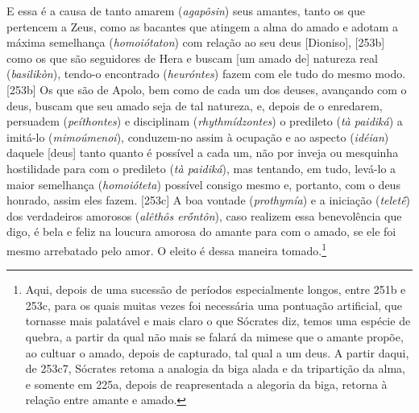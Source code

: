 E essa é a causa de tanto amarem (\emph{agapôsin}) seus amantes, tanto
os que pertencem a Zeus, como as bacantes que atingem a alma do amado e
adotam a máxima semelhança (\emph{homoiótaton}) com relação ao seu deus
{[}Dioniso{]}, {[}253b{]} como os que são seguidores de Hera e buscam
{[}um amado de{]} natureza real (\emph{basilikòn}), tendo-o encontrado
(\emph{heuróntes}) fazem com ele tudo do mesmo modo. {[}253b{]} Os que
são de Apolo, bem como de cada um dos deuses, avançando com o deus,
buscam que seu amado seja de tal natureza, e, depois de o enredarem,
persuadem (\emph{peíthontes}) e disciplinam (\emph{rhythmídzontes}) o
predileto (\emph{tà paidiká}) a imitá-lo (\emph{mimoúmenoi}),
conduzem-no assim à ocupação e ao aspecto (\emph{idéian}) daquele
{[}deus{]} tanto quanto é possível a cada um, não por inveja ou
mesquinha hostilidade para com o predileto (\emph{tà paidiká}), mas
tentando, em tudo, levá-lo a maior semelhança (\emph{homoióteta})
possível consigo mesmo e, portanto, com o deus honrado, assim eles
fazem. {[}253c{]} A boa vontade (\emph{prothymía}) e a iniciação
(\emph{teletḗ}) dos verdadeiros amorosos (\emph{alêthôs erṓntôn}), caso
realizem essa benevolência que digo, é bela e feliz na loucura amorosa
do amante para com o amado, se ele foi mesmo arrebatado pelo amor. O
eleito é dessa maneira tomado.\footnote{Aqui, depois de uma sucessão de
  períodos especialmente longos, entre 251b e 253c, para os quais muitas
  vezes foi necessária uma pontuação artificial, que tornasse mais
  palatável e mais claro o que Sócrates diz, temos uma espécie de
  quebra, a partir da qual não mais se falará da mimese que o amante
  propõe, ao cultuar o amado, depois de capturado, tal qual a um deus. A
  partir daqui, de 253c7, Sócrates retoma a analogia da biga alada e da
  tripartição da alma, e somente em 225a, depois de reapresentada a
  alegoria da biga, retorna à relação entre amante e amado.}


